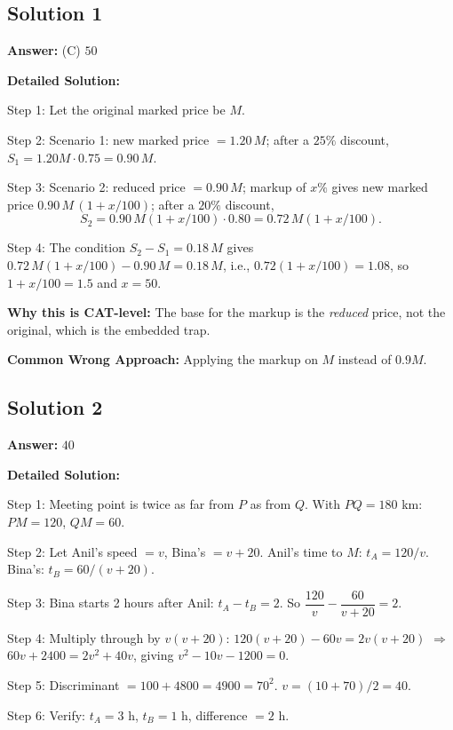 \documentclass[11pt]{article}
\begin{document}
\subsection*{Solution 1}

\textbf{Answer:} (C) \(50\)

\textbf{Detailed Solution:}

Step 1: Let the original marked price be \(M\).

Step 2: Scenario 1: new marked price \(= 1.20\,M\); after a \(25\%\) discount, \(S_1 = 1.20 M \cdot 0.75 = 0.90\,M\).

Step 3: Scenario 2: reduced price \(= 0.90\,M\); markup of \(x\%\) gives new marked price \(0.90\,M\,(1 + x/100)\); after a \(20\%\) discount, 
\[
S_2 = 0.90\,M(1 + x/100)\cdot 0.80 = 0.72\,M(1 + x/100).
\]

Step 4: The condition \(S_2 - S_1 = 0.18\,M\) gives
\(0.72\,M(1 + x/100) - 0.90\,M = 0.18\,M\), i.e., \(0.72(1+x/100) = 1.08\), so \(1 + x/100 = 1.5\) and \(x = 50\).

\textbf{Why this is CAT-level:} The base for the markup is the \emph{reduced} price, not the original, which is the embedded trap.

\textbf{Common Wrong Approach:} Applying the markup on \(M\) instead of \(0.9M\).

\subsection*{Solution 2}

\textbf{Answer:} \(40\)

\textbf{Detailed Solution:}

Step 1: Meeting point is twice as far from \(P\) as from \(Q\). With \(PQ = 180\) km: \(PM = 120\), \(QM = 60\).

Step 2: Let Anil's speed \(=v\), Bina's \(=v+20\). Anil's time to \(M\): \(t_A = 120/v\). Bina's: \(t_B = 60/(v+20)\).

Step 3: Bina starts 2 hours after Anil: \(t_A - t_B = 2\). So
\(\dfrac{120}{v} - \dfrac{60}{v+20} = 2\).

Step 4: Multiply through by \(v(v+20)\): \(120(v+20) - 60v = 2v(v+20)\) \(\Rightarrow\) \(60v + 2400 = 2v^2 + 40v\), giving \(v^2 - 10v - 1200 = 0\).

Step 5: Discriminant \(=100 + 4800 = 4900 = 70^2\). \(v = (10+70)/2 = 40\).

Step 6: Verify: \(t_A = 3\) h, \(t_B = 1\) h, difference \(=2\) h. \checkmark
\end{document}
